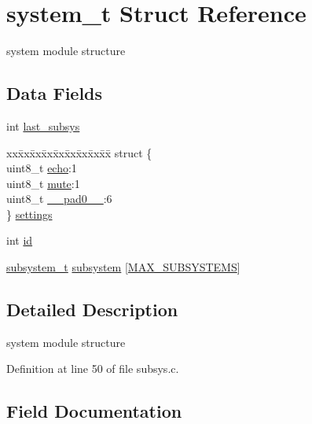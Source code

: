 \hypertarget{structsystem__t}{}\section{system\+\_\+t Struct Reference}
\label{structsystem__t}


system module structure  


\subsection*{Data Fields}
\begin{DoxyCompactItemize}
\item 
int \hyperlink{structsystem__t_ad47bc772fbe53a69905c02f6fc6cdba7}{last\+\_\+subsys}
\item 
\begin{tabbing}
xx\=xx\=xx\=xx\=xx\=xx\=xx\=xx\=xx\=\kill
struct \{\\
\>uint8\_t \hyperlink{structsystem__t_aab09b5cefcdbe22abc17b28373b9ea83}{echo}:1\\
\>uint8\_t \hyperlink{structsystem__t_ad9aef3fe07cb77df6845f5830762396d}{mute}:1\\
\>uint8\_t \hyperlink{structsystem__t_a8b4eebe79ded0459acec2f4950102ba3}{\_\_pad0\_\_}:6\\
\} \hyperlink{structsystem__t_aa55cb52ba643b2fa105ab8910555bf64}{settings}\\

\end{tabbing}\item 
int \hyperlink{structsystem__t_a7441ef0865bcb3db9b8064dd7375c1ea}{id}
\item 
\hyperlink{structsubsystem__t}{subsystem\+\_\+t} \hyperlink{structsystem__t_ad43fe3cf1c5e9944d8e0b98f8be0c5a4}{subsystem} \mbox{[}\hyperlink{subsys_8c_a40eb801bd01d2acdaffef915693c9b58}{M\+A\+X\+\_\+\+S\+U\+B\+S\+Y\+S\+T\+E\+M\+S}\mbox{]}
\end{DoxyCompactItemize}


\subsection{Detailed Description}
system module structure 

Definition at line 50 of file subsys.\+c.



\subsection{Field Documentation}
\hypertarget{structsystem__t_a8b4eebe79ded0459acec2f4950102ba3}{}
